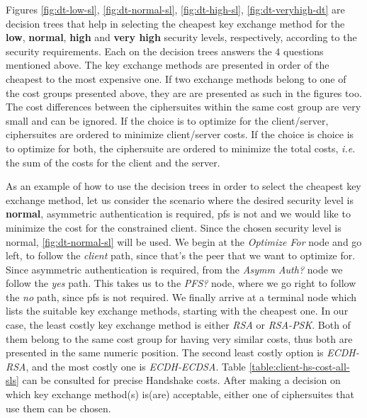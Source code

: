 \documentclass{llncs}
\begin{document}
Figures \ref{fig:dt-low-sl}, \ref{fig:dt-normal-sl}, \ref{fig:dt-high-sl}, \ref{fig:dt-veryhigh-dt} are decision trees that
help in selecting the cheapest key exchange method for the \textbf{low}, \textbf{normal}, \textbf{high} and \textbf{very high}
security levels, respectively, according to the security requirements. Each on the decision trees answers the $4$ questions
mentioned above. The key exchange methods are presented in order of the cheapest to the most expensive one. If two exchange methods
belong to one of the cost groups presented above, they are are presented as such in the figures too. The cost differences between
the ciphersuites within the same cost group are very small and can be ignored. If the choice is to optimize for the client/server,
ciphersuites are ordered to minimize client/server costs. If the choice is choice is to optimize for both, the
ciphersuite are ordered to minimize the total costs, \textit{i.e.} the sum of the costs for the client and the server.

As an example of how to use the decision trees in order to select the cheapest key exchange method, let us consider the scenario
where the desired security level is \textbf{normal}, asymmetric authentication is required, \gls{pfs} is not and we would like to
minimize the cost for the constrained client. Since the chosen security level is normal, \ref{fig:dt-normal-sl} will be used.
We begin at the \textit{Optimize For} node and go left, to follow the \textit{client} path, since that's the peer that we
want to optimize for. Since asymmetric authentication is required, from the \textit{Asymm Auth?} node we follow the \textit{yes}
path. This takes us to the \textit{PFS?} node, where we go right to follow the \textit{no} path, since \gls{pfs} is not required.
We finally arrive at a terminal node which lists the suitable key exchange methods, starting with the cheapest one.
In our case, the least costly key exchange method is either \textit{RSA} or \textit{RSA-PSK}. Both of them belong to the same
cost group for having very similar costs, thus both are presented in the same numeric position. The second least costly option
is \textit{ECDH-RSA}, and the most costly one is \textit{ECDH-ECDSA}. Table \ref{table:client-hs-cost-all-sls} can be consulted for
precise Handshake costs. After making a decision on which key exchange method(s) is(are) acceptable, either one of ciphersuites that
use them can be chosen.
\end{document}

